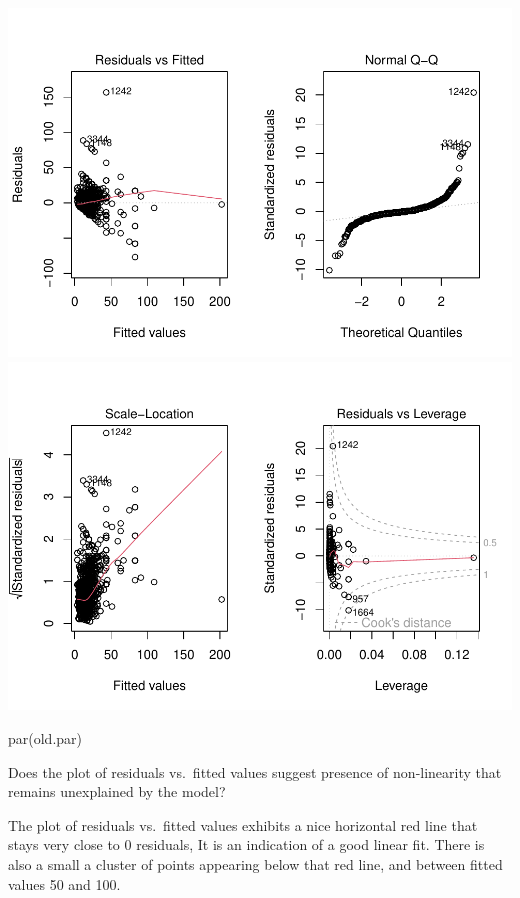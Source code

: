 \documentclass[
]{article}
\newenvironment{Shaded}{\begin{snugshade}}{\end{snugshade}}
\newcommand{\FunctionTok}[1]{\textcolor[rgb]{0.00,0.00,0.00}{#1}}
\newcommand{\NormalTok}[1]{#1}
\begin{document}
\includegraphics{linear_regression__uc_files/figure-latex/Problem1_Q4-1.pdf}
\includegraphics{linear_regression__uc_files/figure-latex/Problem1_Q4-2.pdf}

\begin{Shaded}
\begin{Highlighting}[]
\FunctionTok{par}\NormalTok{(old.par)}
\end{Highlighting}
\end{Shaded}

Does the plot of residuals vs.~fitted values suggest presence of
non-linearity that remains unexplained by the model?

The plot of residuals vs.~fitted values exhibits a nice horizontal red
line that stays very close to 0 residuals, It is an indication of a good
linear fit. There is also a small a cluster of points appearing below
that red line, and between fitted values 50 and 100.
\end{document}

